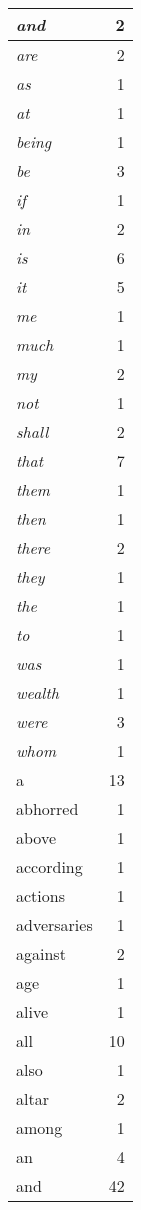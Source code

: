 \begin{center}
\begin{longtable}{l|r}
\emph{and} & 2 \\ \hline
\emph{are} & 2 \\ \hline
\emph{as} & 1 \\ \hline
\emph{at} & 1 \\ \hline
\emph{being} & 1 \\ \hline
\emph{be} & 3 \\ \hline
\emph{if} & 1 \\ \hline
\emph{in} & 2 \\ \hline
\emph{is} & 6 \\ \hline
\emph{it} & 5 \\ \hline
\emph{me} & 1 \\ \hline
\emph{much} & 1 \\ \hline
\emph{my} & 2 \\ \hline
\emph{not} & 1 \\ \hline
\emph{shall} & 2 \\ \hline
\emph{that} & 7 \\ \hline
\emph{them} & 1 \\ \hline
\emph{then} & 1 \\ \hline
\emph{there} & 2 \\ \hline
\emph{they} & 1 \\ \hline
\emph{the} & 1 \\ \hline
\emph{to} & 1 \\ \hline
\emph{was} & 1 \\ \hline
\emph{wealth} & 1 \\ \hline
\emph{were} & 3 \\ \hline
\emph{whom} & 1 \\ \hline
a & 13 \\ \hline
abhorred & 1 \\ \hline
above & 1 \\ \hline
according & 1 \\ \hline
actions & 1 \\ \hline
adversaries & 1 \\ \hline
against & 2 \\ \hline
age & 1 \\ \hline
alive & 1 \\ \hline
all & 10 \\ \hline
also & 1 \\ \hline
altar & 2 \\ \hline
among & 1 \\ \hline
an & 4 \\ \hline
and & 42 \\ \hline

\end{longtable}
\end{center}
